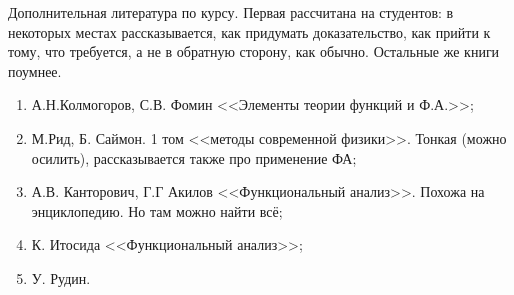 \documentclass[document]{subfiles}
\begin{document}
Дополнительная литература по курсу. Первая рассчитана на студентов: в некоторых местах рассказывается, как придумать доказательство, как прийти к тому, что требуется,
а не в обратную сторону, как обычно. Остальные же книги поумнее.
\
\begin{enumerate}
    \item А.Н.Колмогоров, С.В. Фомин <<Элементы теории функций и Ф.А.>>;
    \item М.Рид, Б. Саймон. 1 том <<методы современной физики>>. Тонкая (можно осилить), рассказывается также про применение ФА;
    \item А.В. Канторович, Г.Г Акилов <<Функциональный анализ>>. Похожа на энциклопедию. Но там можно найти всё;
    \item К. Итосида <<Функциональный анализ>>;
    \item У. Рудин.
\end{enumerate}
\end{document}
